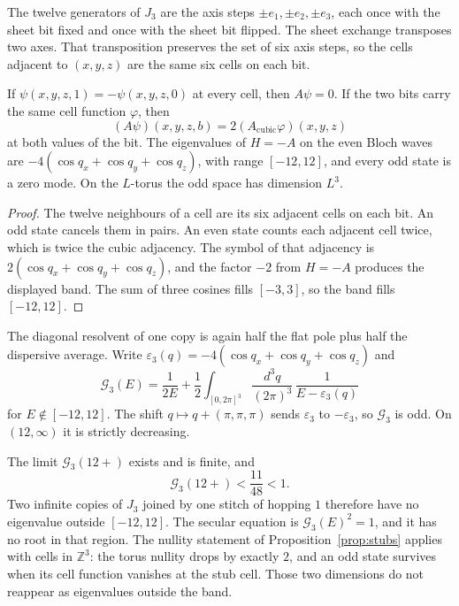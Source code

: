 The twelve generators of \(J_3\) are the axis steps \(\pm e_1,\pm e_2,\pm e_3\),
each once with the sheet bit fixed and once with the sheet bit flipped.
The sheet exchange transposes two axes.
That transposition preserves the set of six axis steps, so the cells
adjacent to \((x,y,z)\) are the same six cells on each bit.

\begin{lemma}
\label{lem:j3sectors}
If \(\psi(x,y,z,1)=-\psi(x,y,z,0)\) at every cell, then \(A\psi=0\).
If the two bits carry the same cell function
\(\varphi\), then
\[
(A\psi)(x,y,z,b)=2(A_{\mathrm{cubic}}\varphi)(x,y,z)
\]
at both values of the bit.
The eigenvalues of \(H=-A\) on the even Bloch waves are
\(-4(\cos q_x+\cos q_y+\cos q_z)\), with range \([-12,12]\), and every odd
state is a zero mode.
On the \(L\)-torus the odd space has dimension \(L^3\).
\end{lemma}

\begin{proof}
The twelve neighbours of a cell are its six adjacent cells on each bit.
An odd state cancels them in pairs.
An even state counts each adjacent cell twice, which is twice the cubic
adjacency.
The symbol of that adjacency is \(2(\cos q_x+\cos q_y+\cos q_z)\), and the
factor \(-2\) from \(H=-A\) produces the displayed band.
The sum of three cosines fills \([-3,3]\), so the band fills \([-12,12]\).
\end{proof}

The diagonal resolvent of one copy is again half the flat pole plus half
the dispersive average. Write \(\varepsilon_3(q)=-4(\cos q_x+\cos q_y+\cos q_z)\)
and
\[
\mathcal{G}_3(E)
=\frac{1}{2E}
+\frac12\int_{[0,2\pi]^3}\frac{d^3q}{(2\pi)^3}\,
\frac{1}{E-\varepsilon_3(q)}
\]
for \(E\notin[-12,12]\).
The shift \(q\mapsto q+(\pi,\pi,\pi)\) sends \(\varepsilon_3\) to \(-\varepsilon_3\),
so \(\mathcal{G}_3\) is odd.
On \((12,\infty)\) it is strictly decreasing.

\begin{proposition}
\label{prop:j3stitch}
The limit \(\mathcal{G}_3(12+)\) exists and is finite, and
\[
\mathcal{G}_3(12+)<\frac{11}{48}<1.
\]
Two infinite copies of \(J_3\) joined by one stitch of hopping \(1\)
therefore have no eigenvalue outside \([-12,12]\).
The secular equation is \(\mathcal{G}_3(E)^2=1\), and it has no root in
that region.
The nullity statement of Proposition~\ref{prop:stubs} applies with cells
in \(\mathbb{Z}^3\): the torus nullity drops by exactly \(2\), and an odd state
survives when its cell function vanishes at the stub cell.
Those two dimensions do not reappear as eigenvalues outside the band.
\end{proposition}

